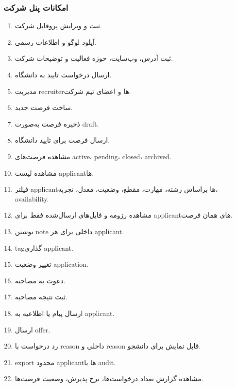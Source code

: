 \documentclass[12pt,a4paper]{article}
\begin{document}
\subsubsection{امکانات پنل شرکت}
\begin{enumerate}
\item ثبت و ویرایش پروفایل شرکت.
\item آپلود لوگو و اطلاعات رسمی.
\item ثبت آدرس، وب‌سایت، حوزه فعالیت و توضیحات شرکت.
\item ارسال درخواست تایید به دانشگاه.
\item مدیریت recruiterها و اعضای تیم شرکت.
\item ساخت فرصت جدید.
\item ذخیره فرصت به‌صورت draft.
\item ارسال فرصت برای تایید دانشگاه.
\item مشاهده فرصت‌های active، pending، closed، archived.
\item مشاهده لیست applicantها.
\item فیلتر applicantها براساس رشته، مهارت، مقطع، وضعیت، معدل، تجربه، availability.
\item مشاهده رزومه و فایل‌های ارسال‌شده فقط برای applicantهای همان فرصت.
\item نوشتن note داخلی برای هر applicant.
\item tagگذاری applicant.
\item تغییر وضعیت application.
\item دعوت به مصاحبه.
\item ثبت نتیجه مصاحبه.
\item ارسال پیام یا اطلاعیه به applicant.
\item ارسال offer.
\item رد درخواست با reason داخلی و reason قابل نمایش برای دانشجو.
\item export محدود applicantها با audit.
\item مشاهده گزارش تعداد درخواست‌ها، نرخ پذیرش، وضعیت فرصت‌ها.
\end{enumerate}
\end{document}
